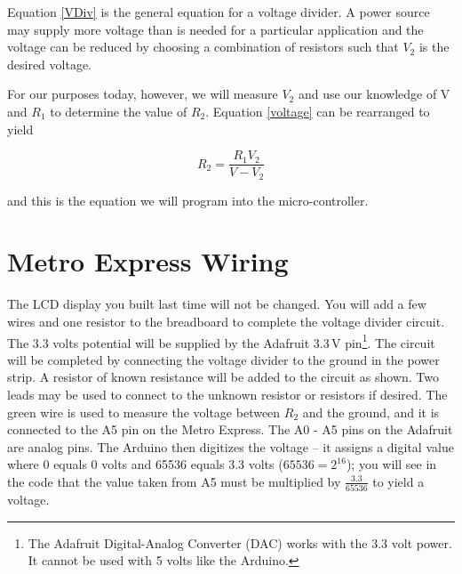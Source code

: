 \documentclass[]{article}
\begin{document}
	Equation \ref{VDiv} is the general equation for a voltage divider.  A power source may supply more voltage than is needed for a particular application and the voltage can be reduced by choosing a combination of resistors such that $V_2$ is the desired voltage.

	For our purposes today, however, we will measure $V_2$ and use our knowledge of V and $R_1$ to determine the value of $R_2$.  Equation \ref{voltage} can be rearranged to yield

	\begin{equation}
		R_2 = \frac{R_1V_2}{V-V_2}
	\end{equation}

	and this is the equation we will program into the micro-controller.

\section{Metro Express Wiring}

	The LCD display you built last time will not be changed.  You will add a few wires and one resistor to the breadboard to complete the voltage divider circuit.  The 3.3 volts potential will be supplied by the Adafruit 3.3\,V pin\footnote{The Adafruit Digital-Analog Converter (DAC) works with the 3.3 volt power.  It cannot be used with 5 volts like the Arduino.}. The circuit will be completed by connecting the voltage divider to the ground in the power strip.  A resistor of known resistance  will be added to the circuit as shown. Two leads may be used to connect to the unknown resistor or resistors if desired.  The green wire is used to measure the voltage between $R_2$ and the ground, and it is connected to the A5 pin on the Metro Express.  The A0 - A5 pins on the Adafruit are analog pins.  The Arduino then digitizes the voltage -- it assigns a digital value where 0 equals 0 volts and 65536 equals 3.3 volts (\(65536=2^{16}\)); you will see in the code that the value taken from A5 must be multiplied by $\frac{3.3}{65536}$ to yield a voltage.
\end{document}
